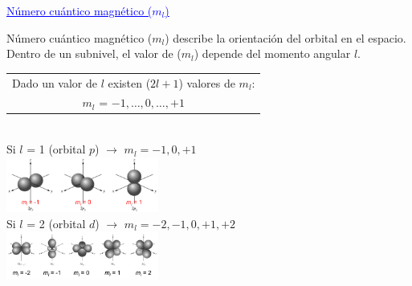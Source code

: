         \begin{center} \textcolor{blue}{\underline{Número cuántico magnético ($m_l$)}} \end{center}
            \indent Número cuántico magnético ($m_l$) describe la orientación del orbital en el espacio. Dentro de un subnivel, el valor de ($m_l$) depende del momento angular $l$.
            \begin{center} 
                \begin{tabular}{| c |}
                    \hline
                    Dado un valor de $l$ existen ($2l + 1$) valores de $m_l$: \\
                    $m_l$ = $-1, \dots, 0, \dots, +1$ \\
                    \hline
                \end{tabular} \\[10pt]
                Si $l$ = 1 (orbital $p$) $\rightarrow$ $m_l = -1, 0, +1$ \\
                \includegraphics[width=5cm] {./imagenes/magneticoOrbitalP.png} \\
                Si $l$ = 2 (orbital $d$) $\rightarrow$ $m_l = -2, -1, 0 , +1 , +2$ \\
                \includegraphics[width=5cm]{./imagenes/magneticoOrbitalD.png}
            \end{center}


